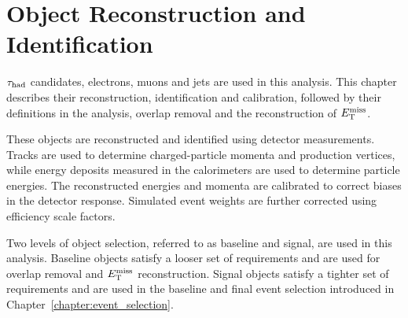 \chapter{Object Reconstruction and Identification}
\label{chapter:object_reconstruction}

$\tau_{\mathrm{had}}$ candidates, electrons, muons and jets are used in this analysis.
This chapter describes their reconstruction, identification and calibration, followed by their definitions in the analysis, overlap removal and the reconstruction of $E_{\mathrm{T}}^{\mathrm{miss}}$.

These objects are reconstructed and identified using detector measurements.
Tracks are used to determine charged-particle momenta and production vertices, while energy deposits measured in the calorimeters are used to determine particle energies.
The reconstructed energies and momenta are calibrated to correct biases in the detector response.
Simulated event weights are further corrected using efficiency scale factors.

Two levels of object selection, referred to as baseline and signal, are used in this analysis.
Baseline objects satisfy a looser set of requirements and are used for overlap removal and $E_{\mathrm{T}}^{\mathrm{miss}}$ reconstruction.
Signal objects satisfy a tighter set of requirements and are used in the baseline and final event selection introduced in Chapter~\ref{chapter:event_selection}.









% 


